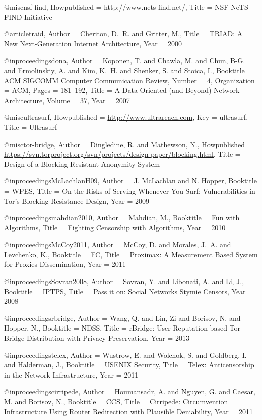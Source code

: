 {{{{{{{{{@misc{nsf-find,
	Howpublished = {http://www.nets-find.net/},
	Title = {{NSF NeTS FIND Initiative}}}

@article{traid,
	Author = {Cheriton, D.~R. and Gritter, M.},
	Title = {{TRIAD: A New Next-Generation Internet Architecture}},
	Year = {2000}}

@inproceedings{dona,
	Author = {Koponen, T. and Chawla, M. and Chun, B-G. and Ermolinskiy, A. and Kim, K.~H. and Shenker, S. and Stoica, I.},
	Booktitle = {ACM SIGCOMM Computer Communication Review},
	Number = {4},
	Organization = {ACM},
	Pages = {181--192},
	Title = {{A Data-Oriented (and Beyond) Network Architecture}},
	Volume = {37},
	Year = {2007}}

@misc{ultrasurf,
	Howpublished = {\url{http://www.ultrareach.com}},
	Key = {ultrasurf},
	Title = {{Ultrasurf}}}

@misc{tor-bridge,
	Author = {Dingledine, R. and Mathewson, N.},
	Howpublished = {\url{https://svn.torproject.org/svn/projects/design-paper/blocking.html}},
	Title = {{Design of a Blocking-Resistant Anonymity System}}}

@inproceedings{McLachlanH09,
	Author = {J. McLachlan and N. Hopper},
	Booktitle = {WPES},
	Title = {{On the Risks of Serving Whenever You Surf: Vulnerabilities in Tor's Blocking Resistance Design}},
	Year = {2009}}

@inproceedings{mahdian2010,
	Author = {Mahdian, M.},
	Booktitle = {{Fun with Algorithms}},
	Title = {{Fighting Censorship with Algorithms}},
	Year = {2010}}

@inproceedings{McCoy2011,
	Author = {McCoy, D. and Morales, J.~A. and Levchenko, K.},
	Booktitle = {FC},
	Title = {{Proximax: A Measurement Based System for Proxies Dissemination}},
	Year = {2011}}

@inproceedings{Sovran2008,
	Author = {Sovran, Y. and Libonati, A. and Li, J.},
	Booktitle = {IPTPS},
	Title = {{Pass it on: Social Networks Stymie Censors}},
	Year = {2008}}

@inproceedings{rbridge,
	Author = {Wang, Q. and Lin, Zi and Borisov, N. and Hopper, N.},
	Booktitle = {{NDSS}},
	Title = {{rBridge: User Reputation based Tor Bridge Distribution with Privacy Preservation}},
	Year = {2013}}

@inproceedings{telex,
	Author = {Wustrow, E. and Wolchok, S. and Goldberg, I. and Halderman, J.},
	Booktitle = {{USENIX Security}},
	Title = {{Telex: Anticensorship in the Network Infrastructure}},
	Year = {2011}}

@inproceedings{cirripede,
	Author = {Houmansadr, A. and Nguyen, G. and Caesar, M. and Borisov, N.},
	Booktitle = {CCS},
	Title = {{Cirripede: Circumvention Infrastructure Using Router Redirection with Plausible Deniability}},
	Year = {2011}}

}}}}}}}}}
